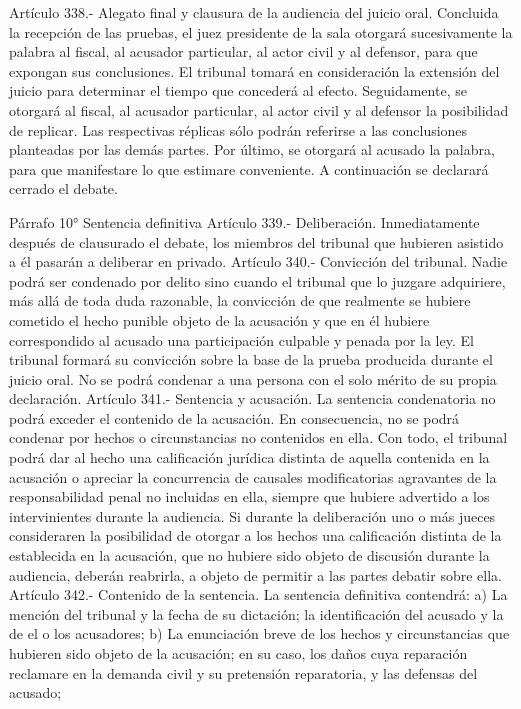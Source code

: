     Artículo 338.- Alegato final y clausura de la audiencia del juicio oral. Concluida la recepción de las pruebas, el juez presidente de la sala otorgará sucesivamente la palabra al fiscal, al acusador particular, al actor civil y al defensor, para que expongan sus conclusiones. El tribunal tomará en consideración la extensión del juicio para determinar el tiempo que concederá al efecto.
    Seguidamente, se otorgará al fiscal, al acusador particular, al actor civil y al defensor la posibilidad de replicar. Las respectivas réplicas sólo podrán referirse a las conclusiones planteadas por las demás partes.
    Por último, se otorgará al acusado la palabra, para que manifestare lo que estimare conveniente. A continuación se declarará cerrado el debate.

    Párrafo 10° Sentencia definitiva
    Artículo 339.- Deliberación. Inmediatamente después de clausurado el debate, los miembros del tribunal que hubieren asistido a él pasarán a deliberar en privado.
    Artículo 340.- Convicción del tribunal. Nadie podrá ser condenado por delito sino cuando el tribunal que lo juzgare adquiriere, más allá de toda duda razonable, la convicción de que realmente se hubiere cometido el hecho punible objeto de la acusación y que en él hubiere correspondido al acusado una participación culpable y penada por la ley.
    El tribunal formará su convicción sobre la base de la prueba producida durante el juicio oral.
    No se podrá condenar a una persona con el solo mérito de su propia declaración.
    Artículo 341.- Sentencia y acusación. La sentencia condenatoria no podrá exceder el contenido de la acusación. En consecuencia, no se podrá condenar por hechos o circunstancias no contenidos en ella.
    Con todo, el tribunal podrá dar al hecho una calificación jurídica distinta de aquella contenida en la acusación o apreciar la concurrencia de causales modificatorias agravantes de la responsabilidad penal no incluidas en ella, siempre que hubiere advertido a los intervinientes durante la audiencia.
    Si durante la deliberación uno o más jueces consideraren la posibilidad de otorgar a los hechos una calificación distinta de la establecida en la acusación, que no hubiere sido objeto de discusión durante la audiencia, deberán reabrirla, a objeto de permitir a las partes debatir sobre ella.
    Artículo 342.- Contenido de la sentencia. La sentencia definitiva contendrá:
    a) La mención del tribunal y la fecha de su dictación; la identificación del acusado y la de el o los acusadores;
    b) La enunciación breve de los hechos y circunstancias que hubieren sido objeto de la acusación; en su caso, los daños cuya reparación reclamare en la demanda civil y su pretensión reparatoria, y las defensas del acusado;
